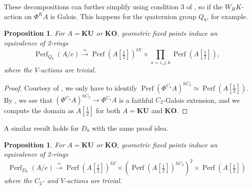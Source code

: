 \documentclass[11pt, a4paper]{article}
\newcommand{\1}{\mathbf{1}}
\newcommand{\gKU}{{\mathbf{KU}}}
\newcommand{\gKO}{{\mathbf{KO}}}
\DeclareMathOperator{\Perf}{Perf}
\theoremstyle{plain}
\newtheorem{prop}[equation]{Proposition}
\theoremstyle{definition}
\theoremstyle{remark}\numberwithin{equation}{section}
\begin{document}
These decompositions can further simplify using condition 3 of , so if the $W_H K$-action on $\Phi^K A$ is {Galois}. This happens for the quaternion group $Q_8$, for example.

\begin{prop}\label{pr:KU_decomp_Q8}
    For $A=\gKU$ or $\gKO$, geometric fixed points induce an equivalence of 2-rings
    \[\Perf_{Q_8}(A/e) \xrightarrow{\simeq} {\Perf(A[\tfrac{1}{2}])^{hV} \times \prod_{x=i,j,k} \Perf(A[\tfrac{1}{2}])},\]
    where the $V$-actions are trivial.
\end{prop}

\begin{proof}
    Courtesy of , we only have to identify $\Perf(\Phi^{C_4}A)^{hC_2} \simeq \Perf(A[\tfrac{1}{2}])$. By , we see that $(\Phi^{C_4} A)^{hC_2} \to \Phi^{C_4} A$ is a faithful $C_2$-Galois extension, and we compute the domain as $A[\tfrac{1}{2}]$ for both $A=\gKU$ and $\gKO$.
\end{proof}

A similar result holds for $D_8$ with the same proof idea.

\begin{prop}\label{pr:KU_decomp_D8}
    For $A=\gKU$ or $\gKO$, geometric fixed points induce an equivalence of 2-rings
    \[\Perf_{D_8}(A/e) \xrightarrow{\simeq} {\Perf(A[\tfrac{1}{2}])^{hV} \times \left( \Perf(A[\tfrac{1}{2}])^{hC_2} \right)^2 \times \Perf(A[\tfrac{1}{2}])}\]
    where the $C_2$- and $V$-actions are trivial.
\end{prop}
\end{document}
